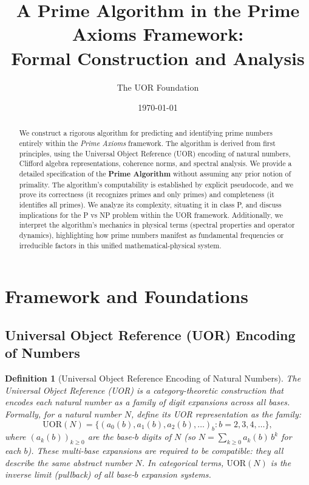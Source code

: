 \documentclass[11pt]{article}
\newtheorem{definition}{Definition}
\begin{document}
\title{A Prime Algorithm in the Prime Axioms Framework:\\ 
Formal Construction and Analysis}
\author{The UOR Foundation}
\date{\today}
\maketitle

\begin{abstract}
We construct a rigorous algorithm for predicting and identifying prime numbers entirely within the \emph{Prime Axioms} framework. The algorithm is derived from first principles, using the Universal Object Reference (UOR) encoding of natural numbers, Clifford algebra representations, coherence norms, and spectral analysis. We provide a detailed specification of the \textbf{Prime Algorithm} without assuming any prior notion of primality. The algorithm’s computability is established by explicit pseudocode, and we prove its correctness (it recognizes primes and only primes) and completeness (it identifies all primes). We analyze its complexity, situating it in class P, and discuss implications for the P vs NP problem within the UOR framework. Additionally, we interpret the algorithm’s mechanics in physical terms (spectral properties and operator dynamics), highlighting how prime numbers manifest as fundamental frequencies or irreducible factors in this unified mathematical-physical system.
\end{abstract}

\section{Framework and Foundations}

\subsection{Universal Object Reference (UOR) Encoding of Numbers}
\begin{definition}[Universal Object Reference Encoding of Natural Numbers]
The \emph{Universal Object Reference (UOR)} is a category-theoretic construction that encodes each natural number as a family of digit expansions across all bases. Formally, for a natural number $N$, define its UOR representation as the family:
\[ \mathrm{UOR}(N) = \{(a_0(b), a_1(b), a_2(b),\dots)_b : b = 2,3,4,\dots\}, \] 
where $(a_k(b))_{k\ge0}$ are the base-$b$ digits of $N$ (so $N = \sum_{k\ge0} a_k(b)\, b^k$ for each $b$). These multi-base expansions are required to be \emph{compatible}: they all describe the same abstract number $N$. In categorical terms, $\mathrm{UOR}(N)$ is the inverse limit (pullback) of all base-$b$ expansion systems. 
\end{definition}
\end{document}
